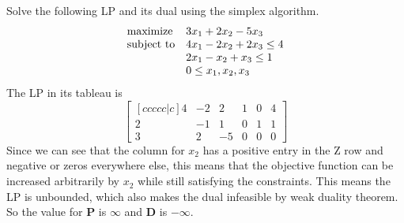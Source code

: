 \documentclass[12pt]{article}
\newenvironment{exercise}[2][Exercise]{\begin{trivlist}
		\item[\hskip \labelsep {\bfseries #1}\hskip \labelsep {\bfseries #2.}]}{\end{trivlist}}
\begin{document}
\begin{exercise}{2} Solve the following LP and its dual using the simplex algorithm.
\begin{equation*}
\begin{array}{ll@{}ll}
\text{maximize}  & \displaystyle 3x_1+2x_2-5x_3 &\\
\text{subject to}& \displaystyle 4x_1-2x_2+2x_3 \leq 4   \\
                 & \displaystyle 2x_1-x_2+x_3 \leq 1 \\
                 & \displaystyle 0 \leq x_1,x_2,x_3
\end{array}
\end{equation*}
The LP in its tableau is 
\[\begin{bmatrix}[ccccc|c]
	4 & -2 & 2 & 1 & 0 & 4\\
	2 & -1 & 1 & 0 & 1 & 1\\
	3 & 2 & -5 & 0 & 0 & 0
\end{bmatrix}\]
Since we can see that the column for $x_2$ has a positive entry in the Z row and negative or zeros everywhere else, this means that the objective function can be increased arbitrarily by $x_2$ while still satisfying the constraints. This means the LP is unbounded, which also makes the dual infeasible by weak duality theorem. So the value for $\boldsymbol{P}$ is $\infty$ and $\boldsymbol{D}$ is $-\infty$.

\end{exercise}
\end{document}
